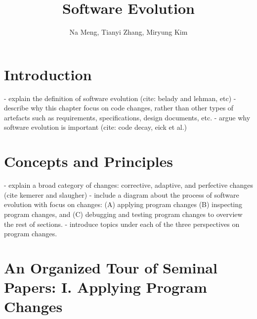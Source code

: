 \documentclass[runningheads,a4paper]{llncs}
\begin{document}
\mainmatter  %

\title{Software Evolution} 


%
%
\author{Na Meng, Tianyi Zhang, Miryung Kim} 



\maketitle


\begin{abstract}
\end{abstract}


\section{Introduction}
- explain the definition of software evolution (cite: belady and lehman, etc)
- describe why this chapter focus on code changes, rather than other types of artefacts such as requirements, specifications, design documents, etc. 
- argue why software evolution is important (cite: code decay, eick et al.) 

\section{Concepts and Principles}
- explain a broad category of changes: corrective, adaptive, and perfective changes (cite kemerer and slaugher)  
- include a diagram about the process of software evolution with focus on changes: (A) applying program changes (B) inspecting program changes, and (C) debugging and testing program changes to overview the rest of sections.  
- introduce topics under each of the three perspectives on program changes. 

\section{An Organized Tour of Seminal Papers: I. Applying Program Changes}
\end{document}

